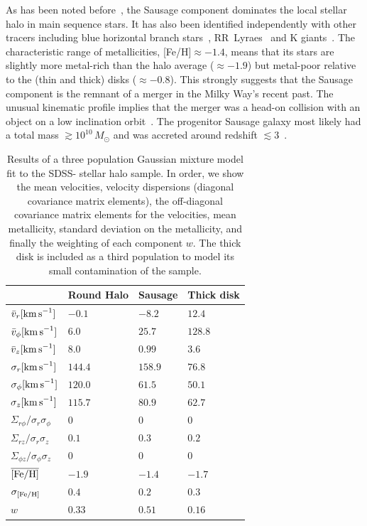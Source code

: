 \documentclass[prd,10pt,twocolumn,showpacs,nofootinbib,aps,superscriptaddress,preprintnumbers]{revtex4-1}
\newcommand{\ra}[1]{\renewcommand{\arraystretch}{#1}}
\newcommand{\Gaia}{\!{\it Gaia}\xspace}
\begin{document}
 As has been noted before~\cite{My18,Be18,Ma18,Haywood:2018}, the
 Sausage component dominates the local stellar halo in main sequence
 stars. It has also been identified independently with other tracers
 including blue horizontal branch
 stars~\cite{Lancaster:2019,Deason:2011wt},
 RR~Lyraes~\cite{Watkins:2009im,He18} and K
 giants~\cite{Bird:2019}. The characteristic range of metallicities,
 [Fe/H]$ \approx -1.4$, means that its stars are slightly more
 metal-rich than the halo average ($\approx-1.9$) but metal-poor
 relative to the (thin and thick) disks ($\approx-0.8$). This strongly
 suggests that the Sausage component is the remnant of a merger in the
 Milky Way's recent past. The unusual kinematic profile implies that
 the merger was a head-on collision with an object on a low inclination
 orbit~\cite{Be18}.  The progenitor Sausage galaxy most likely had a
 total mass $\gtrsim 10^{10}\, M_\odot$ and was accreted around
 redshift $\lesssim 3$~\cite{Be18,Fattahi:2018,Mackereth:2019}. 


 \begin{table}[t!]
 \ra{1.3}
 \begin{tabularx}{0.49\textwidth}{X|XXX}
 \hline\hline
       & {\bf Round Halo}& {\bf Sausage} & {\bf Thick disk}  \\
       \hline
 $\bar{v}_r[{\rm km\,s}^{-1}]$ & $-0.1$  & $-8.2$  &  $12.4$ \\
 $\bar{v}_\phi[{\rm km\,s}^{-1}]$ & $6.0$ & $25.7$ & $128.8$ \\
 $\bar{v}_z[{\rm km\,s}^{-1}]$ & $8.0$ & $0.99$ & $3.6$ \\
 $\sigma_r[{\rm km\,s}^{-1}]$ & $144.4$  &  $158.9$  & $76.8$ \\
 $\sigma_\phi[{\rm km\,s}^{-1}]$ & $120.0$ & $61.5$ & $50.1$ \\
 $\sigma_z[{\rm km\,s}^{-1}]$ & $115.7$ & $80.9$ & $62.7$ \\
 $\Sigma_{r\phi}/\sigma_r\sigma_\phi$ & $0$ & $0$ & $0$ \\
 $\Sigma_{rz}/\sigma_r\sigma_z$ & $0.1$ & $0.3$ & $0.2$ \\
 $\Sigma_{\phi z}/\sigma_\phi\sigma_z$ & $0$ & $0$ & $0$ \\
 $\overline{\rm [Fe/H]}$ & $-1.9$ & $-1.4$ & $-1.7$ \\
 $\sigma_{\rm [Fe/H]}$ & $0.4$ & $0.2$ & $0.3$ \\
 $w$ & $0.33$ & $0.51$ & $0.16$ \\
        \hline\hline
 \end{tabularx}
 \caption{Results of a three population Gaussian mixture model fit to
   the SDSS-\Gaia stellar halo sample. In order, we show the mean velocities, velocity dispersions (diagonal covariance matrix elements),
   the off-diagonal covariance matrix elements for the velocities, mean metallicity, standard deviation on the metallicity, and finally the
    weighting of each component $w$. The thick disk is included as
   a third population to model its small contamination of the sample.}
 \label{tab:fit}
 \end{table}
\end{document}
